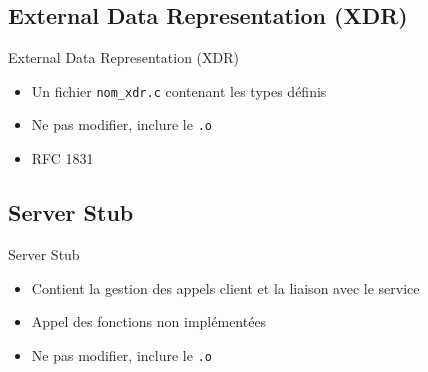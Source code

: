 \begin{frame}[containsverbatim]{\sectitle}
    \def\subsectitle{External Data Representation (XDR)}
    \subsection{\subsectitle}
    \begin{block}{\subsectitle}
        \begin{itemize}
            \item Un fichier \verb+nom_xdr.c+ contenant les types définis
            \item Ne pas modifier, inclure le \verb+.o+
            \item RFC 1831
        \end{itemize}
    \end{block}
    \def\subsectitle{Server Stub}
    \subsection{\subsectitle}
    \begin{block}{\subsectitle}
        \begin{itemize}
            \item Contient la gestion des appels client et la liaison avec le
                service
            \item Appel des fonctions non implémentées
            \item Ne pas modifier, inclure le \verb+.o+
        \end{itemize}
    \end{block}
\end{frame}

\def\sectitle{}

